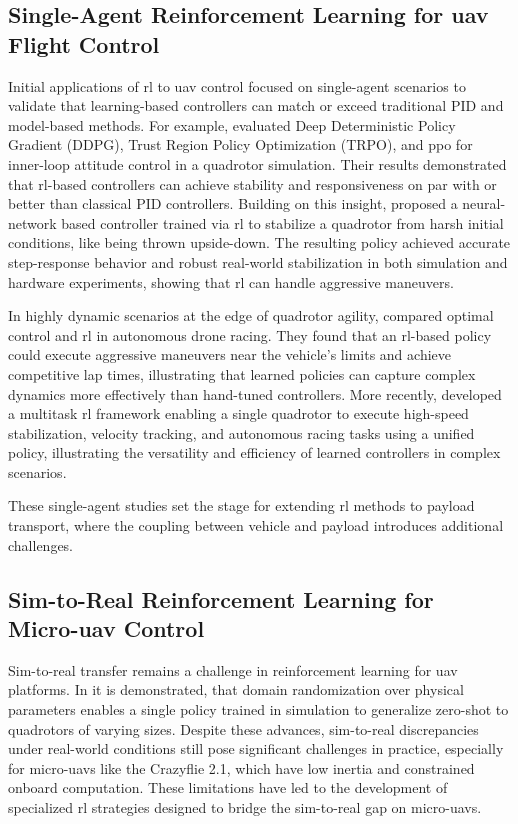 \subsection{Single-Agent Reinforcement Learning for \gls{uav} Flight Control}

Initial applications of \gls{rl} to \gls{uav} control focused on single-agent scenarios to validate that learning-based controllers can match or exceed traditional PID and model-based methods. For example, \cite{Koch2018ReinforcementLF} evaluated Deep Deterministic Policy Gradient (DDPG)\cite{Lillicrap2015ContinuousCW}, Trust Region Policy Optimization (TRPO)\cite{Schulman2015TrustRP}, and \gls{ppo}\cite{schulman_proximal_2017} for inner-loop attitude control in a quadrotor simulation. Their results demonstrated that \gls{rl}-based controllers can achieve stability and responsiveness on par with or better than classical PID controllers. Building on this insight, \cite{Hwangbo2017ControlOA} proposed a neural-network based controller trained via \gls{rl} to stabilize a quadrotor from harsh initial conditions, like being thrown upside-down. The resulting policy achieved accurate step-response behavior and robust real-world stabilization in both simulation and hardware experiments, showing that \gls{rl} can handle aggressive maneuvers.

In highly dynamic scenarios at the edge of quadrotor agility, \cite{Song2023ReachingTL} compared optimal control and \gls{rl} in autonomous drone racing. They found that an \gls{rl}-based policy could execute aggressive maneuvers near the vehicle's limits and achieve competitive lap times, illustrating that learned policies can capture complex dynamics more effectively than hand-tuned controllers. More recently, \cite{xing_multi-task_2024} developed a multitask \gls{rl} framework enabling a single quadrotor to execute high-speed stabilization, velocity tracking, and autonomous racing tasks using a unified policy, illustrating the versatility and efficiency of learned controllers in complex scenarios. 

These single-agent studies set the stage for extending \gls{rl} methods to payload transport, where the coupling between vehicle and payload introduces additional challenges.

\subsection{Sim-to-Real Reinforcement Learning for Micro-\gls{uav} Control}
Sim-to-real transfer remains a challenge in reinforcement learning for \gls{uav} platforms. In \cite{molchanov_sim--multi-real_2019} it is demonstrated, that domain randomization over physical parameters enables a single policy trained in simulation to generalize zero-shot to quadrotors of varying sizes. Despite these advances, sim-to-real discrepancies under real-world conditions still pose significant challenges in practice, especially for micro-\glspl{uav} like the Crazyflie 2.1, which have low inertia and constrained onboard computation. These limitations have led to the development of specialized \gls{rl} strategies designed to bridge the sim-to-real gap on micro-\glspl{uav}.

